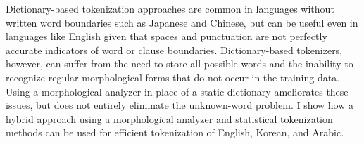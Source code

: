 Dictionary-based tokenization approaches are common in languages without written word boundaries such as Japanese and Chinese, but can be useful even in languages like English given that spaces and punctuation are not perfectly accurate indicators of word or clause boundaries. Dictionary-based tokenizers, however, can suffer from the need to store all possible words and the inability to recognize regular morphological forms that do not occur in the training data. Using a morphological analyzer in place of a static dictionary ameliorates these issues, but does not entirely eliminate the unknown-word problem. I show how a hybrid approach using a morphological analyzer and statistical tokenization methods can be used for efficient tokenization of English, Korean, and Arabic. 